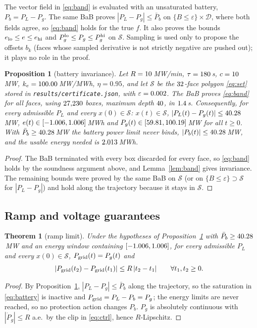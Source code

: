 \documentclass[journal]{IEEEtran}
\newtheorem{theorem}{Theorem}
\newtheorem{proposition}{Proposition}
\theoremstyle{remark}
\newcommand{\Pbar}{\bar P_b}
\newcommand{\D}{\mathcal{D}}
\newcommand{\Sset}{\mathcal{S}}
\begin{document}
The vector field in \eqref{eq:band} is evaluated with an unsaturated battery, $P_b=P_L-P_g$. The same BaB proves
$|P_L-P_g|\le\Pbar$ on $\{B\le\varepsilon\}\times\D$, where both fields agree, so \eqref{eq:band} holds for the true
$f$. It also proves the bounds $e_{\rm lo}\le e\le e_{\rm hi}$ and $P_g^{\rm lo}\le P_g\le P_g^{\rm hi}$ on $\Sset$.
Sampling is used only to propose the offsets $b_k$ (faces whose sampled derivative is not strictly negative are pushed
out); it plays no role in the proof.

\begin{proposition}[battery invariance]\label{prop:battery}
Let $R=10$\,MW/min, $\tau=180$\,s, $c=10$\,MW, $k_e=100.00$\,MW/MWh, $\eta=0.95$, and let $\Sset$ be the
$32$-face polygon \eqref{eq:set} stored in \texttt{results/certificate.json}, with $\varepsilon=0.002$.
The BaB proves \eqref{eq:band} for all faces, using $27{,}230$ boxes, maximum depth $40$, in
$1.4$\,s. Consequently, for every admissible $P_L$ and every $x(0)\in\Sset$: $x(t)\in\Sset$, $|P_L(t)-P_g(t)|\le
40.28$\,MW, $e(t)\in[-1.006,1.006]$\,MWh and $P_g(t)\in[59.81,100.19]$\,MW for all $t\ge0$. With $\Pbar\ge\PbMax$\,MW
the battery power limit never binds, $|P_b(t)|\le40.28$\,MW, and the usable energy needed is $2.013$\,MWh.
\end{proposition}
\begin{proof}
The BaB terminated with every box discarded for every face, so \eqref{eq:band} holds by the soundness argument above,
and Lemma~\ref{lem:band} gives invariance. The remaining bounds were proved by the same BaB on $\Sset$ (or on
$\{B\le\varepsilon\}\supset\Sset$ for $|P_L-P_g|$) and hold along the trajectory because it stays in $\Sset$.
\end{proof}

\subsection{Ramp and voltage guarantees}
\begin{theorem}[ramp limit]\label{thm:ramp}
Under the hypotheses of Proposition~\ref{prop:battery} with $\Pbar\ge\PbMax$\,MW and an energy window containing
$[-1.006,1.006]$, for every admissible $P_L$ and every $x(0)\in\Sset$, $P_{\rm grid}(t)=P_g(t)$ and
\[
|P_{\rm grid}(t_2)-P_{\rm grid}(t_1)|\le R\,|t_2-t_1|\qquad\forall t_1,t_2\ge 0 .
\]
\end{theorem}
\begin{proof}
By Proposition~\ref{prop:battery}, $|P_L-P_g|\le\Pbar$ along the trajectory, so the saturation in
\eqref{eq:battery} is inactive and $P_{\rm grid}=P_L-P_b=P_g$; the energy limits are never reached, so no
protection action changes $P_b$. $P_g$ is absolutely continuous with $|\dot P_g|\le R$ a.e.\ by the clip in
\eqref{eq:ctrl}, hence $R$-Lipschitz.
\end{proof}
\end{document}
